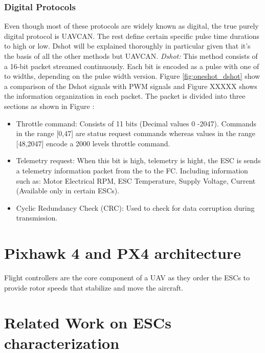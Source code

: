 \subsubsection{Digital Protocols}
Even though most of these protocols are widely known as digital, the true purely digital protocol is UAVCAN. The rest define certain specific pulse time durations to high or low. Dshot will be explained thoroughly in particular given that it's the basis of all the other methods but UAVCAN.
\newline
\textit{Dshot: } This method consists of a 16-bit packet streamed continuously. Each bit is encoded as a pulse with one of to widths, depending on the pulse width version. Figure \ref{fig:oneshot_dshot} show a comparison of the Dshot signals with PWM signals and Figure XXXXX shows the information organization in each packet. The packet is divided into three sections as shown in Figure : 
\begin{itemize}
    \item Throttle command: Consists of 11 bits (Decimal values 0 -2047). Commands in the range [0,47] are status request commands whereas values in the range [48,2047] encode a 2000 levels throttle command.
    \item Telemetry request: When this bit is high, telemetry is hight, the ESC is sends a telemetry information packet from the to the FC. Including information such as: Motor Electrical RPM, ESC Temperature, Supply Voltage, Current (Available only in certain ESCs).
    \item Cyclic Redundancy Check (CRC): Used to check for data corruption during transmission.
\end{itemize}



\section{Pixhawk 4 and PX4 architecture}
Flight controllers are the core component of a UAV as they order the ESCs to provide rotor speeds that stabilize and move the aircraft. 

\section{Related Work on ESCs characterization}

